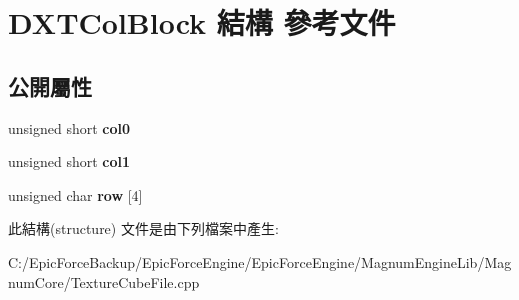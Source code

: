 \hypertarget{struct_d_x_t_col_block}{}\section{D\+X\+T\+Col\+Block 結構 參考文件}
\label{struct_d_x_t_col_block}
\subsection*{公開屬性}
\begin{DoxyCompactItemize}
\item 
unsigned short {\bfseries col0}\hypertarget{struct_d_x_t_col_block_aa3180e662b4bfcb960219b829a2b8c0e}{}\label{struct_d_x_t_col_block_aa3180e662b4bfcb960219b829a2b8c0e}

\item 
unsigned short {\bfseries col1}\hypertarget{struct_d_x_t_col_block_a4dd493400572c839982f5de4b5af8025}{}\label{struct_d_x_t_col_block_a4dd493400572c839982f5de4b5af8025}

\item 
unsigned char {\bfseries row} \mbox{[}4\mbox{]}\hypertarget{struct_d_x_t_col_block_ad5da6a8bbf2f6fd77dcee134dba33463}{}\label{struct_d_x_t_col_block_ad5da6a8bbf2f6fd77dcee134dba33463}

\end{DoxyCompactItemize}


此結構(structure) 文件是由下列檔案中產生\+:\begin{DoxyCompactItemize}
\item 
C\+:/\+Epic\+Force\+Backup/\+Epic\+Force\+Engine/\+Epic\+Force\+Engine/\+Magnum\+Engine\+Lib/\+Magnum\+Core/Texture\+Cube\+File.\+cpp\end{DoxyCompactItemize}
